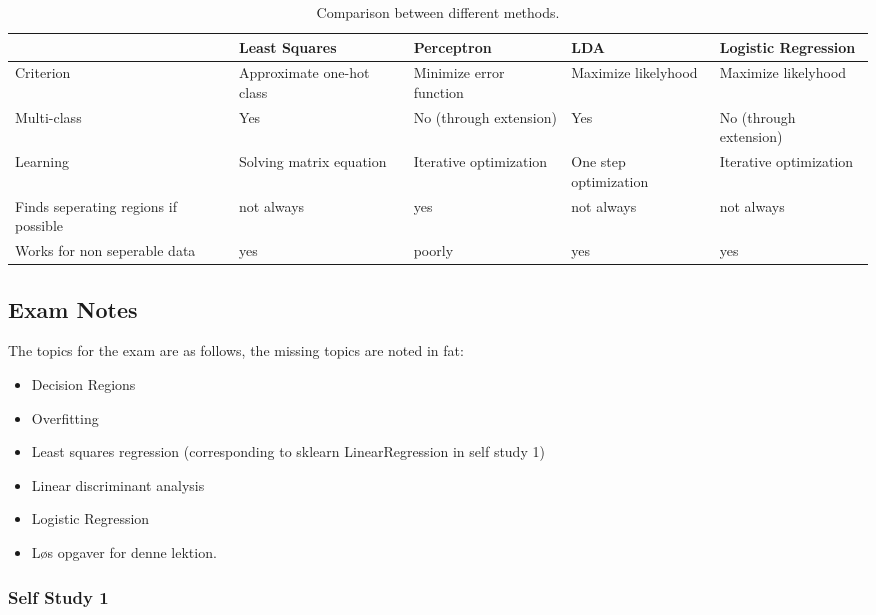 \begin{table}[h]
    \caption{Comparison between different methods.}
    \label{tab:lin:compare}
    \begin{tabularx}{\linewidth}{XXXXX}
        \toprule
                  & Least Squares & Perceptron & LDA & Logistic Regression \\ \midrule
        Criterion & Approximate one-hot class & Minimize error function & Maximize likelyhood & Maximize likelyhood \\
        Multi-class & Yes & No (through extension) & Yes & No (through extension)  \\
        Learning & Solving matrix equation & Iterative optimization & One step optimization & Iterative optimization \\
        Finds seperating regions if possible & not always & yes & not always & not always \\
        Works for non seperable data & yes & poorly & yes & yes \\ \bottomrule
    \end{tabularx}
\end{table}

\subsection{Exam Notes}

The topics for the exam are as follows, the missing topics are noted in fat:
\begin{itemize}
    \item Decision Regions
    \item Overfitting
    \item Least squares regression (corresponding to sklearn LinearRegression in self study 1)
    \item Linear discriminant analysis
    \item Logistic Regression
\end{itemize}

\begin{mdframed}[frametitle={Questions that Need Answering}]
    \begin{itemize}
        \item Løs opgaver for denne lektion.
    \end{itemize}
\end{mdframed}

\subsubsection{Self Study 1}

